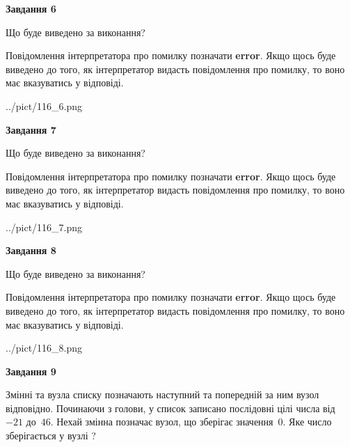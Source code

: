 \documentclass[12pt, ukrainian]{article}
\begin{document}
{\begin {large}
{\begin {center}\textbf{Завдання 6}\end {center}}\par
Що буде виведено за виконання?

Повідомлення інтерпретатора про помилку позначати \textbf{error}.
Якщо щось буде виведено до того, як інтерпретатор видасть повідомлення про помилку, 
то воно має вказуватись у відповіді. \par


\begin{center}
	{../pict/116_6.png}
\end{center}
\newpage

{\begin {center}\textbf{Завдання 7}\end {center}}\par
Що буде виведено за виконання?

Повідомлення інтерпретатора про помилку позначати \textbf{error}.
Якщо щось буде виведено до того, як інтерпретатор видасть повідомлення про помилку, 
то воно має вказуватись у відповіді. \par


\begin{center}
	{../pict/116_7.png}
\end{center}
\newpage

{\begin {center}\textbf{Завдання 8}\end {center}}\par
Що буде виведено за виконання?

Повідомлення інтерпретатора про помилку позначати \textbf{error}.
Якщо щось буде виведено до того, як інтерпретатор видасть повідомлення про помилку, 
то воно має вказуватись у відповіді. \par


\begin{center}
	{../pict/116_8.png}
\end{center}
\newpage

{\begin {center}\textbf{Завдання 9}\end {center}}\par
Змінні  та  вузла списку позначають наступний та попередній за ним вузол відповідно. Починаючи з голови, у список записано послідовні цілі числа від~$-21$ до~$46$. Нехай змінна  позначає вузол, що зберігає значення~$0$.
Яке число зберігається у вузлі  ?\par
\newpage


\end{large}}
\end{document}
